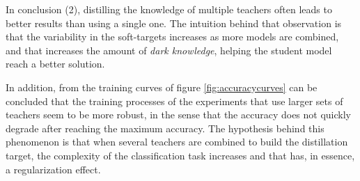  In conclusion (2), distilling the knowledge of multiple teachers often leads to better results than using a single one.  The intuition behind that observation is that the variability in the soft-targets increases as more models are combined, and that increases the amount of \textit{dark knowledge}, helping the student model reach a better solution. 
 
 In addition, from the training curves of figure \ref{fig:accuracycurves} can be concluded that the training processes of the experiments that use larger sets of teachers seem to be more robust, in the sense that the accuracy does not quickly degrade after reaching the maximum accuracy. The hypothesis behind this phenomenon is that when several teachers are combined to build the distillation target, the complexity of the classification task increases and that has, in essence, a regularization effect.
 
